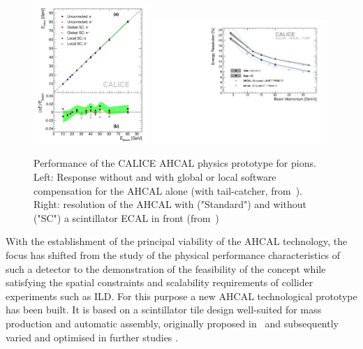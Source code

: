 \begin{figure}[hbt]
\centering
\includegraphics[width=0.39\textwidth]{Detector/fig/AHCAL-Linearity_Ini_GC_LC.pdf}
\includegraphics[width=0.59\textwidth]{Detector/fig/AHCALpion_resolution_data_ahcaljinst.pdf}
\caption{Performance of the CALICE AHCAL physics prototype for pions. Left: Response without and with global or local software compensation for the AHCAL alone (with tail-catcher, from~\cite{Adloff:2012gv}). Right: resolution of the AHCAL with ("Standard") and without ("SC") a scintillator ECAL in front (from~\cite{Repond:2018flg})}
\label{fig:ahcal-linres}
\end{figure}

With the establishment of the principal viability of the AHCAL technology, the focus has shifted from the study of the physical performance characteristics of such a detector to the demonstration of the feasibility of the concept while satisfying the spatial constraints and scalability requirements of collider experiments such as ILD. For this purpose a new AHCAL technological prototype has been built. It is based on a scintillator tile design well-suited for mass production and automatic assembly, originally proposed in~\cite{Blazey:2009zz} and subsequently varied and optimised in further studies \cite{Simon:2010hf, Liu:2015cpe}. 

